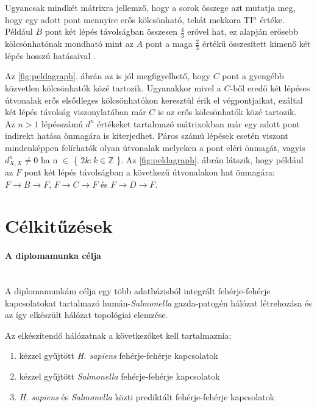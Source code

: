 \documentclass[a4paper,12pt]{article}
\begin{document}
	Ugyancsak mindkét mátrixra jellemző, hogy a sorok összege azt mutatja meg, hogy egy adott pont mennyire erős kölcsönható, tehát mekkora TI$^n$ értéke. Például $B$ pont két lépés távolságban összesen $\frac{4}{3}$ erővel hat, ez alapján erősebb kölcsönhatónak mondható mint az $A$ pont a maga $\frac{2}{3}$ értékű összesített kimenő két lépés hosszú hatásaival \cite{ti}.

	Az \ref{fig:peldagraph}. ábrán az is jól megfigyelhető, hogy $C$ pont a gyengébb közvetlen kölcsönhatók közé tartozik. Ugyanakkor mivel a $C$-ből eredő két lépéses útvonalak erős elsődleges kölcsönhatókon keresztül érik el végpontjaikat, ezáltal két lépés távolság viszonylatában már $C$ is az erős kölcsönhatók közé tartozik. \\
	\indent Az $n > 1$ lépésszámú $d^n$ értékeket tartalmazó mátrixokban már egy adott pont indirekt hatása önmagára is kiterjedhet. Páros számú lépések esetén viszont mindenképpen felírhatók olyan útvonalak melyeken a pont eléri önmagát, \cite{ti} vagyis $d^n_{X,X} \neq 0$ ha n $\in$ \{ $2k :  k \in \mathbb{Z}$ \}. Az \ref{fig:peldagraph}. ábrán látszik, hogy például az $F$ pont két lépés távolságban a következű útvonalakon hat önmagára: $F \rightarrow B \rightarrow F$, $F \rightarrow C \rightarrow F$ és  $F \rightarrow D \rightarrow F$.
 	 \pagebreak

\section{Célkitűzések}
	\paragraph{A diplomamunka célja} \mbox{}\\
	A diplomamunkám célja egy több adatbázisból integrált fehérje-fehérje kapcsolatokat tartalmazó humán-\textit{Salmonella} gazda-patogén hálózat létrehozása és az így elkészült hálózat topológiai elemzése.


	Az elkészítendő hálózatnak a következőket kell tartalmaznia:
	\begin{enumerate}
			\item kézzel gyűjtött  \textit{H. sapiens} fehérje-fehérje kapcsolatok
			\item kézzel gyűjtött  \textit{Salmonella} fehérje-fehérje kapcsolatok
			\item \textit{H. sapiens} és \textit{Salmonella} közti prediktált fehérje-fehérje kapcsolatok
	\end{enumerate}
\end{document}

